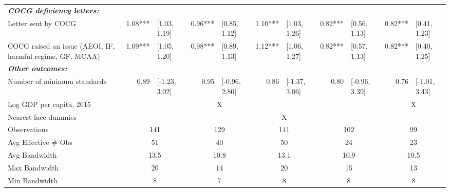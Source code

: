 \begin{adjustbox}{max width=\textwidth}
\begin{tabular}{l*{5}{r@{\hspace{3pt}}l}}
\midrule \emph{{\bf COCG deficiency letters: }}&&&&&&&&&&\\
\hspace{.4cm} Letter sent by COCG& 1.08*** & [1.03, 1.19] & 0.96*** & [0.85, 1.12] & 1.10*** & [1.03, 1.26] & 0.82*** & [0.56, 1.13] & 0.82*** & [0.41, 1.23] \\
\hspace{.4cm} COCG raised an issue (AEOI, IF, harmful regime, GF, MCAA)& 1.09*** & [1.05, 1.20] & 0.98*** & [0.89, 1.13] & 1.12*** & [1.06, 1.27] & 0.82*** & [0.57, 1.13] & 0.82*** & [0.40, 1.25] \\
\midrule \emph{{\bf Other outcomes: }}&&&&&&&&&&\\
\hspace{.4cm} Number of minimum standards& 0.89 & [-1.23, 3.02] & 0.95 & [-0.96, 2.80] & 0.86 & [-1.37, 3.06] & 0.80 & [-0.96, 3.39] & 0.76 & [-1.01, 3.43] \\
\midrule Log GDP per capita, 2015&\multicolumn{2}{c}{}&\multicolumn{2}{c}{X}&\multicolumn{2}{c}{}&\multicolumn{2}{c}{}&\multicolumn{2}{c}{X}\\
Nearest-face dummies&\multicolumn{2}{c}{}&\multicolumn{2}{c}{}&\multicolumn{2}{c}{X}&\multicolumn{2}{c}{}&\multicolumn{2}{c}{}\\
Observations&\multicolumn{2}{c}{141}&\multicolumn{2}{c}{129}&\multicolumn{2}{c}{141}&\multicolumn{2}{c}{102}&\multicolumn{2}{c}{99}\\
Avg Effective \# Obs&\multicolumn{2}{c}{51}&\multicolumn{2}{c}{40}&\multicolumn{2}{c}{50}&\multicolumn{2}{c}{24}&\multicolumn{2}{c}{23}\\
Avg Bandwidth&\multicolumn{2}{c}{13.5}&\multicolumn{2}{c}{10.8}&\multicolumn{2}{c}{13.1}&\multicolumn{2}{c}{10.9}&\multicolumn{2}{c}{10.5}\\
Max Bandwidth&\multicolumn{2}{c}{20}&\multicolumn{2}{c}{14}&\multicolumn{2}{c}{20}&\multicolumn{2}{c}{15}&\multicolumn{2}{c}{13}\\
Min Bandwidth&\multicolumn{2}{c}{8}&\multicolumn{2}{c}{7}&\multicolumn{2}{c}{8}&\multicolumn{2}{c}{8}&\multicolumn{2}{c}{8}\\
\bottomrule
\end{tabular}
\end{adjustbox}
